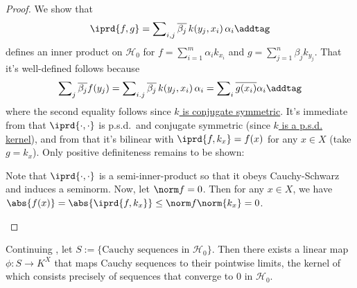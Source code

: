 	\begin{proof}
		We show that
		\[
		\iprd{f, g}
		= \sum\nolimits_{i, j} \overline{\beta_j}\, k(y_j, x_i)\,\alpha_i\addtag\label{EQN: inner prod on H_0}
		\]
		defines an inner product on $\mathscr H_0$ for $f = \sum_{i = 1}^m\alpha_i k_{x_i}$ and $g = \sum_{j = 1}^n \beta_j k_{y_j}$. That it's well-defined follows because
		\[
		\sum\nolimits_j \overline{\beta_j} f(y_j)
		= \sum\nolimits_{i. j} \overline{\beta_j}\, k(y_j, x_i)\,\alpha_i
		= \sum\nolimits_i \overline{g(x_i)} \alpha_i\addtag\label{EQN: inner prod on H_0 well-def}
		\]
		where the second equality follows since \uline{$k$ is conjugate symmetric}.
		It's immediate from  that $\iprd{\cdot, \cdot}$ is p.s.d.\ and conjugate symmetric (since \uline{$k$ is a p.s.d. kernel}), and from  that it's bilinear with $\iprd{f, k_x} = f(x)$ for any $x\in X$ (take $g = k_x$). Only positive definiteness remains to be shown:
		\begin{subproof}
			Note that $\iprd{\cdot, \cdot}$ is a semi-inner-product so that it obeys Cauchy-Schwarz and induces a seminorm. Now, let $\norm f = 0$. Then for any $x\in X$, we have $\abs{f(x)} = \abs{\iprd{f, k_x}} \le \norm f\norm{k_x} = 0$.
		\end{subproof}
	\end{proof}
	
	
	\begin{lem}
		Continuing , let $S := \{\text{Cauchy sequences in $\mathscr H_0$}\}$. Then there exists a linear map $\phi\colon S\to K^X$ that maps Cauchy sequences to their pointwise limits, the kernel of which consists precisely of sequences that converge to $0$ in $\mathscr H_0$.
	\end{lem}
	
